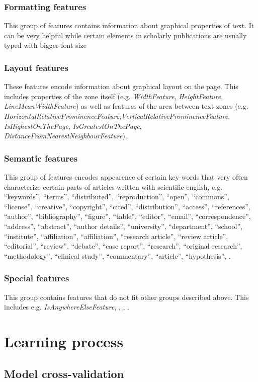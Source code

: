 \subsubsection{Formatting features}
This group of features contains information about graphical properties of text. It can be very helpful while certain elements in scholarly publications are usually typed with bigger font size
\subsubsection{Layout features}
These features encode information about graphical layout on the page. This includes properties of the zone itself (e.g. \textit{WidthFeature}, \textit{HeightFeature}, \textit{LineMeanWidthFeature}) as well as features of the area between text zones (e.g. \textit{HorizontalRelativeProminenceFeature},\textit{VerticalRelativeProminenceFeature}, \textit{IsHighestOnThePage}, \textit{IsGreatestOnThePage}, \textit{DistanceFromNearestNeighbourFeature}). 
\subsubsection{Semantic features}
This group of features encodes appearence of certain key-words that very often characterize certain parts of articles written with scientific english, e.g. ``keywords'', ``terms'', ``distributed'', ``reproduction'', ``open'', ``commons'', ``license'', ``creative'', ``copyright'', ``cited'', ``distribution'', ``access'', ``references'', ``author'', ``bibliography'', ``figure'', ``table'', ``editor'', ``email'', ``correspondence'', ``address'', ``abstract'', ``author details'', ``university'', ``department'', ``school'', ``institute'', ``affiliation'', ``affiliation'', ``research article'', ``review article'', ``editorial'', ``review'', ``debate'', ``case report'', ``research'', ``original research'', ``methodology'', ``clinical study'', ``commentary'', ``article'', 
 ``hypothesis'', .
\subsubsection{Special features}
This group contains features that do not fit other groups described above. This includes e.g. \textit{IsAnywhereElseFeature}, , , .

\section{Learning process}
\subsection{Model cross-validation}